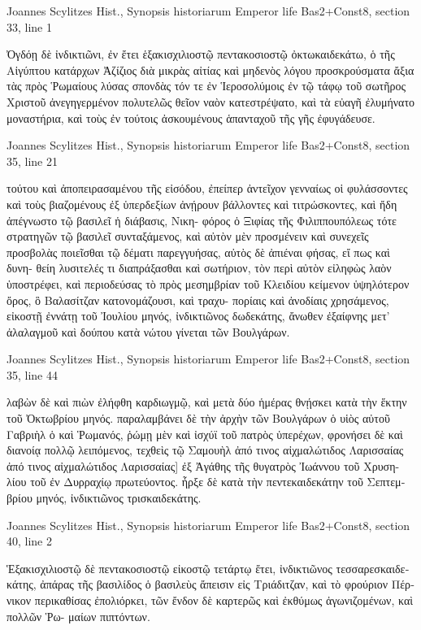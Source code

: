 \documentclass[12pt,letterpaper,twoside,final]{memoir}
\begin{document}
\begin{greek}
Joannes Scylitzes Hist., Synopsis historiarum 
Emperor life Bas2+Const8, section 33, line 1

Ὀγδόῃ δὲ ἰνδικτιῶνι, ἐν ἔτει ἑξακισχιλιοστῷ πεντακοσιοστῷ 
ὀκτωκαιδεκάτω, ὁ τῆς Αἰγύπτου κατάρχων Ἀζίζιος διὰ μικρὰς αἰτίας 
καὶ μηδενὸς λόγου προσκρούσματα ἄξια τὰς πρὸς Ῥωμαίους λύσας 
σπονδὰς τόν τε ἐν Ἱεροσολύμοις ἐν τῷ τάφῳ τοῦ σωτῆρος Χριστοῦ 
ἀνεγηγερμένον πολυτελῶς θεῖον ναὸν κατεστρέψατο, καὶ τὰ εὐαγῆ 
ἐλυμήνατο μοναστήρια, καὶ τοὺς ἐν τούτοις ἀσκουμένους ἁπανταχοῦ 
τῆς γῆς ἐφυγάδευσε. 



Joannes Scylitzes Hist., Synopsis historiarum 
Emperor life Bas2+Const8, section 35, line 21

τούτου καὶ ἀποπειρασαμένου τῆς εἰσόδου, ἐπείπερ ἀντεῖχον γενναίως 
οἱ φυλάσσοντες καὶ τοὺς βιαζομένους ἐξ ὑπερδεξίων ἀνῄρουν βάλλοντες 
καὶ τιτρώσκοντες, καὶ ἤδη ἀπέγνωστο τῷ βασιλεῖ ἡ διάβασις, Νικη-
φόρος ὁ Ξιφίας τῆς Φιλιππουπόλεως τότε στρατηγῶν τῷ βασιλεῖ 
συνταξάμενος, καὶ αὐτὸν μὲν προσμένειν καὶ συνεχεῖς προσβολὰς ποιεῖσθαι 
τῷ δέματι παρεγγυήσας, αὐτὸς δὲ ἀπιέναι φήσας, εἴ πως καὶ δυνη-
θείη λυσιτελές τι διαπράξασθαι καὶ σωτήριον, τὸν περὶ αὐτὸν εἰληφὼς   
λαὸν ὑποστρέφει, καὶ περιοδεύσας τὸ πρὸς μεσημβρίαν τοῦ Κλειδίου 
κείμενον ὑψηλότερον ὄρος, ὃ Βαλασίτζαν κατονομάζουσι, καὶ τραχυ-
πορίαις καὶ ἀνοδίαις χρησάμενος, εἰκοστῇ ἐννάτῃ τοῦ Ἰουλίου μηνός, 
ἰνδικτιῶνος δωδεκάτης, ἄνωθεν ἐξαίφνης μετ' ἀλαλαγμοῦ καὶ δούπου 
κατὰ νώτου γίνεται τῶν Βουλγάρων. 



Joannes Scylitzes Hist., Synopsis historiarum 
Emperor life Bas2+Const8, section 35, line 44

                                   λαβὼν δὲ καὶ πιὼν ἐλήφθη καρδιωγμῷ, 
καὶ μετὰ δύο ἡμέρας θνῄσκει 
κατὰ τὴν ἕκτην τοῦ Ὀκτωβρίου μηνός. 
παραλαμβάνει δὲ τὴν ἀρχὴν τῶν Βουλγάρων ὁ υἱὸς αὐτοῦ Γαβριὴλ 
ὁ καὶ Ῥωμανός, ῥώμῃ μὲν καὶ ἰσχύϊ τοῦ πατρὸς ὑπερέχων, φρονήσει 
δὲ καὶ διανοίᾳ πολλῷ λειπόμενος, τεχθεὶς τῷ Σαμουὴλ ἀπό τινος 
αἰχμαλώτιδος Λαρισσαίας 
ἀπό τινος αἰχμαλώτιδος Λαρισσαίας] ἐξ Ἀγάθης τῆς θυγατρὸς Ἰωάννου τοῦ Χρυση-
λίου τοῦ ἐν Δυρραχίῳ πρωτεύοντος. 
ἦρξε δὲ κατὰ τὴν πεντεκαιδεκάτην τοῦ Σεπτεμβρίου μηνός, ἰνδικτιῶνος 
τρισκαιδεκάτης. 



Joannes Scylitzes Hist., Synopsis historiarum 
Emperor life Bas2+Const8, section 40, line 2

Ἑξακισχιλιοστῷ δὲ πεντακοσιοστῷ εἰκοστῷ τετάρτῳ ἔτει, 
ἰνδικτιῶνος τεσσαρεσκαιδεκάτης, ἀπάρας τῆς βασιλίδος ὁ βασιλεὺς 
ἄπεισιν εἰς Τριάδιτζαν, καὶ τὸ φρούριον Πέρνικον περικαθίσας ἐπολιόρκει, 
τῶν ἔνδον δὲ καρτερῶς καὶ ἐκθύμως ἀγωνιζομένων, καὶ πολλῶν Ῥω-
μαίων πιπτόντων. 




\end{greek}
\end{document}
